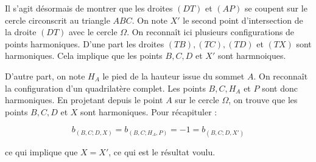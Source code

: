 \begin{sol}
\medskip

Il s'agit désormais de montrer que les droites $(DT)$ et $(AP)$ se coupent sur le cercle circonscrit au triangle $ABC$. On note $X'$ le second point d'intersection de la droite $(DT)$ avec le cercle $\Omega$. On reconnaît ici plusieurs configurations de points harmoniques. D'une part les droites $(TB),(TC), (TD)$ et $(TX)$ sont harmoniques. Cela implique que les points $B,C,D$ et $X'$ sont harmnoiques. 

\medskip

D'autre part, on note $H_A$ le pied de la hauteur issue du sommet $A$. On reconnaît la configuration d'un quadrilatère complet. Les points $B,C,H_A$ et $P$ sont donc harmoniques. En projetant depuis le point $A$ sur le cercle $\Omega$, on trouve que les points $B,C,D$ et $X$ sont harmoniques. Pour récapituler : 

\[b_{(B,C;D,X)}=b_{(B,C;H_A,P)}= -1=b_{(B,C;D,X')}\]

ce qui implique que $X=X'$, ce qui est le résultat voulu.
\end{sol}


